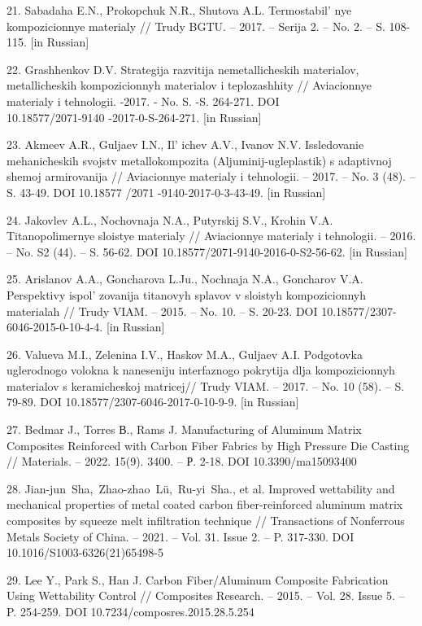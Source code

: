 \begin{references}
21. Sabadaha E.N., Prokopchuk N.R., Shutova A.L.
Termostabil' nye kompozicionnye materialy // Trudy BGTU.
-- 2017. -- Serija 2. -- No. 2. -- S. 108-115. {[}in Russian{]}

22. Grashhenkov D.V. Strategija razvitija nemetallicheskih materialov,
metallicheskih kompozicionnyh materialov i teplozashhity // Aviacionnye
materialy i tehnologii. -2017. - No. S. -S. 264-271. DOI\\
10.18577/2071-9140 -2017-0-S-264-271. {[}in Russian{]}

23. Akmeev A.R., Guljaev I.N., Il' ichev A.V., Ivanov
N.V. Issledovanie mehanicheskih svojstv metallo\-kompozita
(Aljuminij-ugleplastik) s adaptivnoj shemoj armirovanija // Aviacionnye
materialy i tehnologii. -- 2017. -- No. 3 (48). -- S. 43-49. DOI
10.18577 /2071 -9140-2017-0-3-43-49. {[}in Russian{]}

24. Jakovlev A.L., Nochovnaja N.A., Putyrskij S.V., Krohin V.A.
Titanopolimernye sloistye materialy // Aviacionnye materialy i
tehnologii. -- 2016. -- No. S2 (44). -- S. 56-62. DOI
10.18577/2071-9140-2016-0-S2-56-62. {[}in Russian{]}

25. Arislanov A.A., Goncharova L.Ju., Nochnaja N.A., Goncharov V.A.
Perspektivy ispol' zovanija titan\-ovyh splavov v sloistyh
kompozicionnyh materialah // Trudy VIAM. -- 2015. -- No. 10. -- S.
20-23. DOI 10.18577/2307-6046-2015-0-10-4-4. {[}in Russian{]}

26. Valueva M.I., Zelenina I.V., Haskov M.A., Guljaev A.I. Podgotovka
uglerodnogo volokna k naneseniju interfaznogo pokrytija dlja
kompozicionnyh materialov s keramicheskoj matricej// Trudy VIAM. --
2017. -- No. 10 (58). -- S. 79-89. DOI 10.18577/2307-6046-2017-0-10-9-9.
{[}in Russian{]}

27. Bedmar J., Torres В., Rams J. Manufacturing of Aluminum Matrix
Composites Reinforced with Carbon Fiber Fabrics by High Pressure Die
Casting // Materials. -- 2022. 15(9). 3400. -- Р. 2-18. DOI
10.3390/ma15093400

28. Jian-jun~Sha,~Zhao-zhao~Lü,~Ru-yi~Sha., et al. Improved wettability
and mechanical properties of metal coated carbon fiber-reinforced
aluminum matrix composites by squeeze melt infiltration technique //
Transactions of Nonferrous Metals Society of China. -- 2021. -- Vol. 31.
Issue 2. -- P. 317-330. DOI 10.1016/S1003-6326(21)65498-5

29. Lee Y., Park S., Han J. Carbon Fiber/Aluminum Composite Fabrication
Using Wettability Control // Composites Research. -- 2015. -- Vol. 28.
Issue 5. -- P. 254-259. DOI 10.7234/composres.2015.28.5.254


\end{references}
